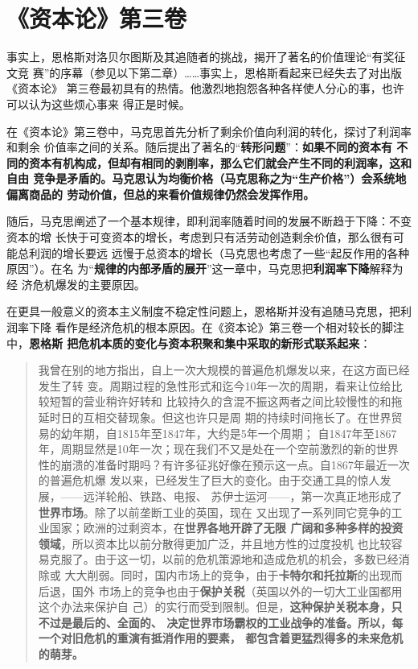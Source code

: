 \section{《资本论》第三卷}
事实上，恩格斯对洛贝尔图斯及其追随者的挑战，揭开了著名的价值理论“有奖征文竞
赛”的序幕（参见以下第二章）……事实上，恩格斯看起来已经失去了对出版《资本论》
第三卷最初具有的热情。他激烈地抱怨各种各样使人分心的事，也许可以认为这些烦心事来
得正是时候。

在《资本论》第三卷中，马克思首先分析了剩余价值向利润的转化，探讨了利润率和剩余
价值率之间的关系。随后提出了著名的“\textbf{转形问题}”：\textbf{如果不同的资本有
  不同的资本有机构成，但却有相同的剥削率，那么它们就会产生不同的利润率，这和自由
  竞争是矛盾的。马克思认为均衡价格（马克思称之为“生产价格”）会系统地偏离商品的
  劳动价值，但总的来看价值规律仍然会发挥作用。}

随后，马克思阐述了一个基本规律，即利润率随着时间的发展不断趋于下降：不变资本的增
长快于可变资本的增长，考虑到只有活劳动创造剩余价值，那么很有可能总利润的增长要远
远慢于总资本的增长（马克思也考虑了一些“起反作用的各种原因”）。在名
为“\textbf{规律的内部矛盾的展开}”这一章中，马克思把\textbf{利润率下降}解释为经
济危机爆发的主要原因。

在更具一般意义的资本主义制度不稳定性问题上，恩格斯并没有追随马克思，把利润率下降
看作是经济危机的根本原因。在《资本论》第三卷一个相对较长的脚注中，\textbf{恩格斯
  把危机本质的变化与资本积聚和集中采取的新形式联系起来}：
\begin{quotation}
  我曾在别的地方指出，自上一次大规模的普遍危机爆发以来，在这方面已经发生了转
  变。周期过程的急性形式和迄今10年一次的周期，看来让位给比较短暂的营业稍许好转和
  比较持久的含混不振这两者之间比较慢性的和拖延时日的互相交替现象。但这也许只是周
  期的持续时间拖长了。在世界贸易的幼年期，自1815年至1847年，大约是5年一个周期；
  自1847年至1867年，周期显然是10年一次；现在我们不又是处在一个空前激烈的新的世界
  性的崩溃的准备时期吗？有许多征兆好像在预示这一点。自1867年最近一次的普遍危机爆
  发以来，已经发生了巨大的变化。由于交通工具的惊人发展，——远洋轮船、铁路、电报、
  苏伊士运河——，第一次真正地形成了\textbf{世界市场}。除了以前垄断工业的英国，现在
  又出现了一系列同它竞争的工业国家；欧洲的过剩资本，在\textbf{世界各地开辟了无限
    广阔和多种多样的投资领域}，所以资本比以前分散得更加广泛，并且地方性的过度投机
  也比较容易克服了。由于这一切，以前的危机策源地和造成危机的机会，多数已经消除或
  大大削弱。同时，国内市场上的竞争，由于\textbf{卡特尔和托拉斯}的出现而后退，国外
  市场上的竞争也由于\textbf{保护关税}（英国以外的一切大工业国都用这个办法来保护自
  己）的实行而受到限制。但是，\textbf{这种保护关税本身，只不过是最后的、全面的、
    决定世界市场霸权的工业战争的准备。所以，每一个对旧危机的重演有抵消作用的要素，
    都包含着更猛烈得多的未来危机的萌芽。}
\end{quotation}

